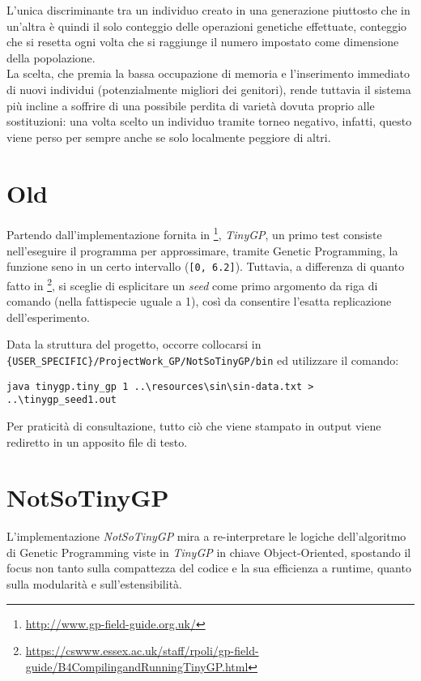 \documentclass{../llncs}
\begin{document}
L'unica discriminante tra un individuo creato in una generazione piuttosto che in un'altra è quindi il solo conteggio delle operazioni genetiche effettuate, conteggio che si resetta ogni volta che si raggiunge il numero impostato come dimensione della popolazione.\\

La scelta, che premia la bassa occupazione di memoria e l'inserimento immediato di nuovi individui (potenzialmente migliori dei genitori), rende tuttavia il sistema più incline a soffrire di una possibile perdita di varietà dovuta proprio alle sostituzioni: una volta scelto un individuo tramite torneo negativo, infatti, questo viene perso per sempre anche se solo localmente peggiore di altri.

\section{Old}
Partendo dall'implementazione fornita in \footnote{\url{http://www.gp-field-guide.org.uk/}}, \emph{TinyGP}, un primo test consiste nell'eseguire il programma per approssimare, tramite Genetic Programming, la funzione seno in un certo intervallo (\texttt{[0, 6.2]}). Tuttavia, a differenza di quanto fatto in \footnote{\url{https://cswww.essex.ac.uk/staff/rpoli/gp-field-guide/B4CompilingandRunningTinyGP.html}}, si sceglie di esplicitare un \emph{seed} come primo argomento da riga di comando (nella fattispecie uguale a 1), così da consentire l'esatta replicazione dell'esperimento.

Data la struttura del progetto, occorre collocarsi in \texttt{\{USER\_SPECIFIC\}/ProjectWork\_GP/NotSoTinyGP/bin} ed utilizzare il comando:
\begin{lstlisting}[caption={Esecuzione di TinyGP da riga di comando}]
java tinygp.tiny_gp 1 ..\resources\sin\sin-data.txt > ..\tinygp_seed1.out
\end{lstlisting}
Per praticità di consultazione, tutto ciò che viene stampato in output viene rediretto in un apposito file di testo.

\section{NotSoTinyGP}
L'implementazione \emph{NotSoTinyGP} mira a re-interpretare le logiche dell'algoritmo di Genetic Programming viste in \emph{TinyGP} in chiave Object-Oriented, spostando il focus non tanto sulla compattezza del codice e la sua efficienza a runtime, quanto sulla modularità e sull'estensibilità.
\end{document}
